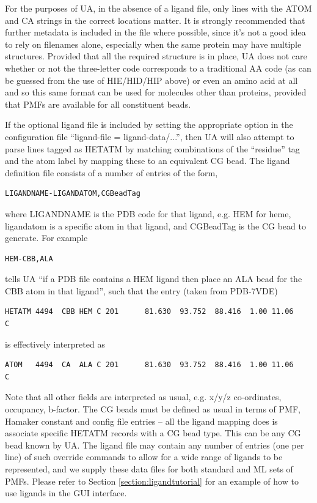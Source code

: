 \documentclass[10pt,a4paper,onecolumn]{report}
\begin{document}
For the purposes of UA, in the absence of a ligand file, only lines with the ATOM and CA strings in the correct locations matter. It is strongly recommended that further metadata is included in the file where possible, since it's not a good idea to rely on filenames alone, especially when the same protein may have multiple structures. Provided that all the required structure is in place, UA does not care whether or not the three-letter code corresponds to a traditional AA code (as can be guessed from the use of HIE/HID/HIP above) or even an amino acid at all and so this same format can be used for molecules other than proteins, provided that PMFs are available for all constituent beads. 

If the optional ligand file is included by setting the appropriate option in the configuration file ``ligand-file = ligand-data/...'', then UA will also attempt to parse lines tagged as HETATM by matching combinations of the ``residue'' tag and the atom label by mapping these to an equivalent CG bead. The ligand definition file consists of a number of entries of the form,
\begin{lstlisting}
LIGANDNAME-LIGANDATOM,CGBeadTag
\end{lstlisting}
where LIGANDNAME is the PDB code for that ligand, e.g. HEM for heme, ligandatom is a specific atom in that ligand, and CGBeadTag is the CG bead to generate.  For example
\begin{lstlisting}
HEM-CBB,ALA
\end{lstlisting}
 tells UA ``if a PDB file contains a HEM ligand then place an ALA bead for the CBB atom in that ligand'', such that the entry (taken from PDB-7VDE)

\begin{lstlisting}
HETATM 4494  CBB HEM C 201      81.630  93.752  88.416  1.00 11.06           C
\end{lstlisting}
is effectively interpreted as
\begin{lstlisting}
ATOM   4494  CA  ALA C 201      81.630  93.752  88.416  1.00 11.06           C
\end{lstlisting}
Note that all other fields are interpreted as usual, e.g. x/y/z co-ordinates, occupancy, b-factor. The CG beads must be defined as usual in terms of PMF, Hamaker constant and config file entries -- all the ligand mapping does is associate specific HETATM records with a CG bead type. This can be any CG bead known by UA. The ligand file may contain any number of entries (one per line) of such override commands to allow for a wide range of ligands to be represented, and we supply these data files for both standard and ML sets of PMFs. Please refer to Section \ref{section:ligandtutorial} for an example of how to use ligands in the GUI interface. 
\end{document}
